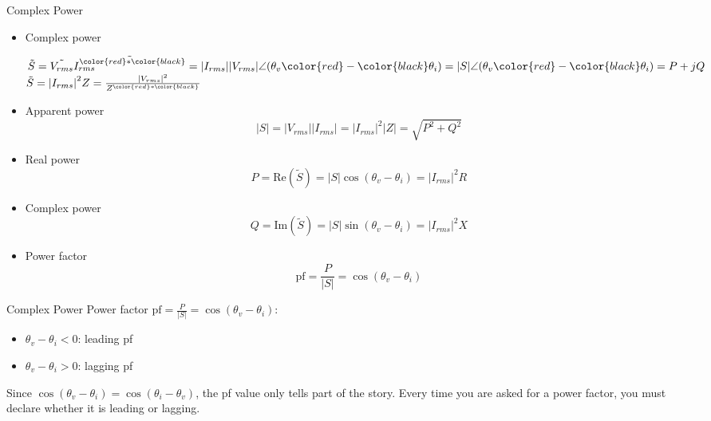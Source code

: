 \documentclass{beamer}
\begin{document}
\begin{frame}{Complex Power}

\begin{itemize}
    \item Complex power
    \begin{center}
        $
        \tilde{S}=\tilde{V_{rms}}\tilde{I_{rms}^{\color{red}*\color{black}}} = \lvert I_{rms}\rvert \lvert V_{rms} \rvert \angle (\theta_{v}\color{red}-\color{black}\theta_{i}) =\lvert S \rvert \angle (\theta_{v}\color{red}-\color{black}\theta_{i}) = P+jQ
        $
        \hspace{0.1mm}
        $
        \tilde{S} = {\vert I_{rms} \vert}^2Z = \frac{{\vert V_{rms}\vert}^2}{Z^{\color{red}*\color{black}}}
        $
    \end{center}
        
    \item Apparent power
     $$
     \lvert S \rvert=  \vert V_{rms}\vert\vert I_{rms}\vert =\lvert I_{rms} \rvert ^{2} \lvert Z \rvert = \sqrt{P^2+Q^2}
     $$

    \item Real power
    $$P = \mathrm{Re}(\tilde{S}) = \vert S\vert \cos(\theta_v-\theta_i) = \lvert I_{rms} \rvert ^{2} R$$
    \item Complex power
    $$Q = \mathrm{Im}(\tilde{S}) = \vert S\vert \sin(\theta_v-\theta_i) = \lvert I_{rms} \rvert ^{2} X$$
    \item Power factor
    $$
    \text{pf} = \frac{P}{\vert S\vert} = \cos(\theta_v-\theta_i)
    $$
\end{itemize}

\end{frame}

\begin{frame}{Complex Power}
    Power factor
    $
    \text{pf} = \frac{P}{\vert S\vert} = \cos(\theta_v-\theta_i)
    $:
    \begin{itemize}
        \item $\theta_v - \theta_i < 0$: leading pf
        \item $\theta_v - \theta_i >0$: lagging pf
    \end{itemize}
    
    Since $\cos (\theta_v - \theta_i) = \cos (\theta_i - \theta_v)$, the pf value only tells part of the story. Every time you are asked for a power factor, \color{red} you must declare whether it is leading or lagging\color{black}.
\end{frame}
\end{document}
